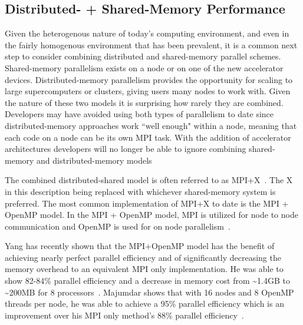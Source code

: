 \subsection*{ \textbf{Distributed- + Shared-Memory Performance}}

%
Given the heterogenous nature of today's computing environment, and even in the fairly homogenous environment that has been prevalent, it is a common next step to consider combining distributed and shared-memory parallel schemes.
%
Shared-memory parallelism exists on a node or on one of the new accelerator devices.
%
Distributed-memory parallelism provides the opportunity for scaling to large supercomputers or clusters, giving users many nodes to work with.
%
Given the nature of these two models it is surprising how rarely they are combined.
%
Developers may have avoided using both types of parallelism to date since 
distributed-memory approaches work ``well enough" within a node, meaning
that each code on a node can be its own MPI task.
%
With the addition of accelerator architectures developers will no longer be able to ignore combining shared-memory and distributed-memory models
%

%
The combined distributed-shared model is often referred to as MPI+X~\cite{michaelwolfe2014}.
%
The X in this description being replaced with whichever shared-memory system is preferred.
%
The most common implementation of MPI+X to date is the MPI + OpenMP model.
%
In the MPI + OpenMP model, MPI is utilized for node to node communication and OpenMP is used for on node parallelism~\cite{michaelwolfe2014}.
%

%
Yang has recently shown that the MPI+OpenMP model has the benefit of achieving nearly perfect parallel efficiency and of significantly decreasing the memory overhead to an equivalent MPI only implementation.
%
He was able to show 82-84\% parallel efficiency and a decrease in memory cost from \textasciitilde1.4GB to \textasciitilde200MB for 8 processors~\cite{yanghybrid}.
%
Majumdar shows that with 16 nodes and 8 OpenMP threads per node, he was able to achieve a 95\% parallel efficiency which is an improvement over his MPI only method's 88\% parallel efficiency~\cite{majumdar2000parallel}. 
%
